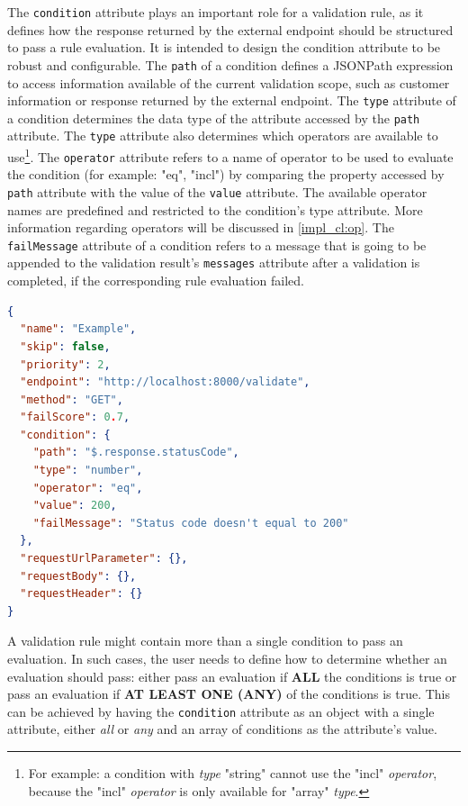    The \verb;condition; attribute plays an important role for a validation rule, as it defines how the response returned by the external endpoint should be structured to pass a rule evaluation. It is intended to design the condition attribute to be robust and configurable. The \verb;path; of a condition defines a JSONPath\autocite{Friesen2019} expression to access information available of the current validation scope, such as customer information or response returned by the external endpoint. The \verb;type; attribute of a condition determines the data type of the attribute accessed by the \verb;path; attribute. The \verb;type; attribute also determines which operators are available to use\footnote{For example: a condition with \emph{type} "string" cannot use the "incl" \emph{operator}, because the "incl" \emph{operator} is only available for "array" \emph{type}.}. The \verb;operator; attribute refers to a name of operator to be used to evaluate the condition (for example: "eq", "incl") by comparing the property accessed by \verb;path; attribute with the value of the \verb;value; attribute. The available operator names are predefined and restricted to the condition's type attribute. More information regarding operators will be discussed in \autoref{impl_cl:op}. The \verb;failMessage; attribute of a condition refers to a message that is going to be appended to the validation result's \verb;messages; attribute after a validation is completed, if the corresponding rule evaluation failed.

    \newpage
    \begin{lstlisting}[caption={Validation rule example (JSON)}, language=json]
{
  "name": "Example",
  "skip": false,
  "priority": 2,
  "endpoint": "http://localhost:8000/validate",
  "method": "GET",
  "failScore": 0.7,
  "condition": {
    "path": "$.response.statusCode",
    "type": "number",
    "operator": "eq",
    "value": 200,
    "failMessage": "Status code doesn't equal to 200"
  },
  "requestUrlParameter": {},
  "requestBody": {},
  "requestHeader": {}
}
    \end{lstlisting}

    A validation rule might contain more than a single condition to pass an evaluation. In such cases, the user needs to define how to determine whether an evaluation should pass: either pass an evaluation if \textbf{ALL} the conditions is true or pass an evaluation if \textbf{AT LEAST ONE (ANY)} of the conditions is true. This can be achieved by having the \verb;condition; attribute as an object with a single attribute, either \emph{all} or \emph{any} and an array of conditions as the attribute's value.

